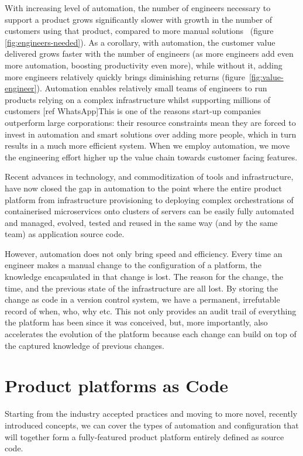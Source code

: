 \documentclass[reprint,amsmath,amssymb,aps]{revtex4-1}
\begin{document}
With increasing level of automation, the number of engineers necessary to support a product grows significantly slower with growth in the number of customers using that product, compared to more manual solutions~\cite{GoogleSi39:online} (figure \ref{fig:engineers-needed}). As a corollary, with automation, the customer value delivered grows faster with the number of engineers (as more engineers add even more automation, boosting productivity even more), while without it, adding more engineers relatively quickly brings diminishing returns (figure~\ref{fig:value-engineer}). Automation enables relatively small teams of engineers to run products relying on a complex infrastructure whilst supporting millions of customers [ref WhatsApp]This is one of the reasons start-up companies outperform large corporations: their resource constraints mean they are forced to invest in automation and smart solutions over adding more people, which in turn results in a much more efficient system. When we employ automation, we move the engineering effort higher up the value chain towards customer facing features.

Recent advances in technology, and commoditization of tools and infrastructure, have now closed the gap in automation to the point where the entire product platform from infrastructure provisioning to deploying complex orchestrations of containerised microservices onto clusters of servers can be easily fully automated and managed, evolved, tested and reused in the same way (and by the same team) as application source code.

However, automation does not only bring speed and efficiency. Every time an engineer makes a manual change to the configuration of a platform, the knowledge encapsulated in that change is lost. The reason for the change, the time, and the previous state of the infrastructure are all lost. By storing the change as code in a version control system, we have a permanent, irrefutable record of when, who, why etc. This not only provides an audit trail of everything the platform has been since it was conceived, but, more importantly, also accelerates the evolution of the platform because each change can build on top of the captured knowledge of previous changes.


\section{Product platforms as Code}
\label{sec:ascode}

Starting from the industry accepted practices and moving to more novel, recently introduced concepts, we can cover the types of automation and configuration that will together form a fully-featured product platform entirely defined as source code.
\end{document}
